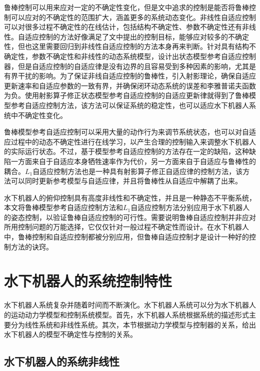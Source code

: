 鲁棒控制可以用来应对一定的不确定性变化，但是文中追求的控制是能否将鲁棒控制可以应对的不确定性的范围扩大，涵盖更多的系统动态变化。非线性自适应控制可以对很多过程不确定性的在线估计，包括结构不确定性、参数不确定性还有非线性。自适应控制的方法好像满足了文中提出的控制目标，能够应对较多的不确定性，但也这里需要回归到非线性自适应控制的方法本身再来判断。针对具有结构不确定性，参数不确定性和非线性的动态系统模型，设计出状态模型参考自适应控制器，但是自适应控制的自适应律是没有边界的且容易受到多种因素的影响，尤其是有界干扰的影响。为了保证非线自适应控制的鲁棒性，引入射影理论，确保自适应更新速率和自适应参数的一致有界，并确保闭环动态系统的误差和李雅普诺夫函数为负。使用射影算子修正状态模型参考自适应控制的自适应更新律就得到了鲁棒模型参考自适应控制方法，该方法可以保证系统的稳定性，也可以适应水下机器人系统中不确定性变化。

鲁棒模型参考自适应控制可以采用大量的动作行为来调节系统状态，也可以对自适应过程中的动态不确定性进行在线学习，以产生合理的控制输入来调整水下机器人的实际运行状态。不过，基于模型参考自适应控制的方法存在一定的缺陷，这种缺陷一方面来自于自适应本身牺牲速率作为代价，另一方面来自于自适应与鲁棒性的耦合。$L_1$自适应控制方法也是一种具有射影算子修正自适应律的控制方法，该方法可以同时更新参考模型与自适应律，并且将鲁棒性从自适应中解耦了出来。

水下机器人的俯仰控制具有高度非线性和不确定性，并且是一种静态不平衡系统，本文将鲁棒模型参考自适应控制方法和$L_1$自适应控制方法分别应用于水下机器人的姿态控制，以验证鲁棒自适应控制的可行性。需要说明鲁棒自适应控制并非应对所用控制问题的万能选择，它仅仅针对一般过程不确定性而设计。在水下机器人中，鲁棒控制和自适应控制都被分别应用，但鲁棒自适应控制才是设计一种好的控制方法的诀窍。

\section{水下机器人的系统控制特性 }

水下机器人系统复杂并随着时间而不断演化。水下机器人系统可以分为水下机器人的运动动力学模型和控制系统模型。首先，水下机器人系统根据系统的描述形式主要分为线性系统和非线性系统。其次，本节根据动力学模型与控制器的关系，给出水下机器人的模型不确定性与控制的关系。


\subsection{水下机器人的系统非线性 }

